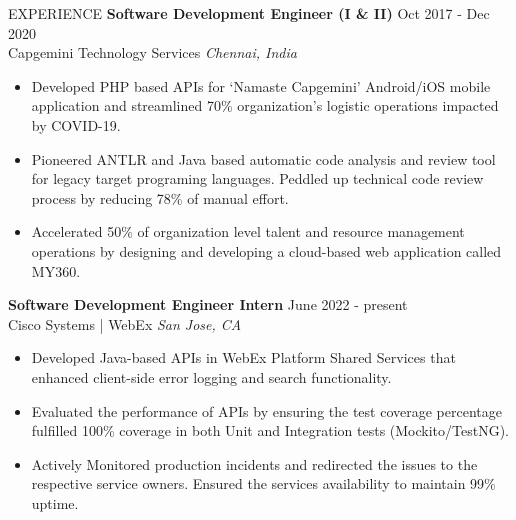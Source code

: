 \documentclass{resume} %
\begin{document}
\begin{rSection}{EXPERIENCE}
\vspace{-0.10em}
\textbf{Software Development Engineer (I \& II)} \hfill Oct  2017 - Dec 2020\\
Capgemini Technology Services \hfill \textit{Chennai, India}
 \begin{itemize}
    \itemsep -1pt {} 
     \item Developed PHP based APIs for ‘Namaste Capgemini’ Android/iOS mobile application and streamlined 70\% organization’s logistic operations impacted by COVID-19.
     \item 	Pioneered ANTLR and Java based automatic code analysis and review tool for legacy target programing languages. Peddled up technical code review process by reducing 78\% of manual effort. 
     \item Accelerated 50\% of organization level talent and resource management operations by designing and developing a cloud-based web application called MY360.
 \end{itemize}
 \vspace{-0.10em}
\textbf{Software Development Engineer Intern} \hfill June  2022 - present\\
Cisco Systems | WebEx \hfill \textit{San Jose, CA}
 \begin{itemize}
    \itemsep -2pt {} 
     \item Developed Java-based APIs in WebEx Platform Shared Services that enhanced client-side error logging and search functionality.
     \item Evaluated the performance of APIs by ensuring the test coverage percentage fulfilled 100\% coverage in both Unit and Integration tests (Mockito/TestNG).
     \item Actively Monitored production incidents and redirected the issues to the respective service owners. Ensured the services availability to maintain 99\% uptime.
 \end{itemize}


\end{rSection} 
\end{document}
